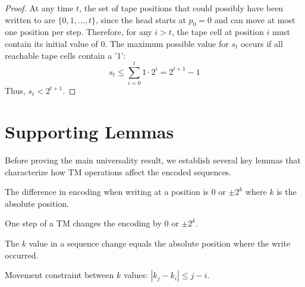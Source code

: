 \begin{proof}
At any time $t$, the set of tape positions that could possibly have been written to are $\{0, 1, \ldots, t\}$, since the head starts at $p_0=0$ and can move at most one position per step. Therefore, for any $i > t$, the tape cell at position $i$ must contain its initial value of $0$. The maximum possible value for $s_t$ occurs if all reachable tape cells contain a '1':
$$s_t \leq \sum_{i=0}^{t} 1 \cdot 2^i = 2^{t+1} - 1$$
Thus, $s_t < 2^{t+1}$.
\end{proof}

\chapter{Supporting Lemmas}

Before proving the main universality result, we establish several key lemmas that characterize how TM operations affect the encoded sequences.

\begin{lemma}
\label{lem:encode_diff_at_write}
\notready
{}
The difference in encoding when writing at a position is $0$ or $\pm 2^k$ where $k$ is the absolute position.
\end{lemma}

\begin{lemma}
\label{lem:sequence_diff_is_power_of_two}
\notready
{}
One step of a TM changes the encoding by $0$ or $\pm 2^k$.
\end{lemma}

\begin{lemma}
\label{lem:sequence_k_equals_position}
\notready
{}
The $k$ value in a sequence change equals the absolute position where the write occurred.
\end{lemma}

\begin{lemma}
\label{lem:sequence_k_movement_constraint}
\notready
{}
Movement constraint between $k$ values: $|k_j - k_i| \leq j - i$.
\end{lemma}

